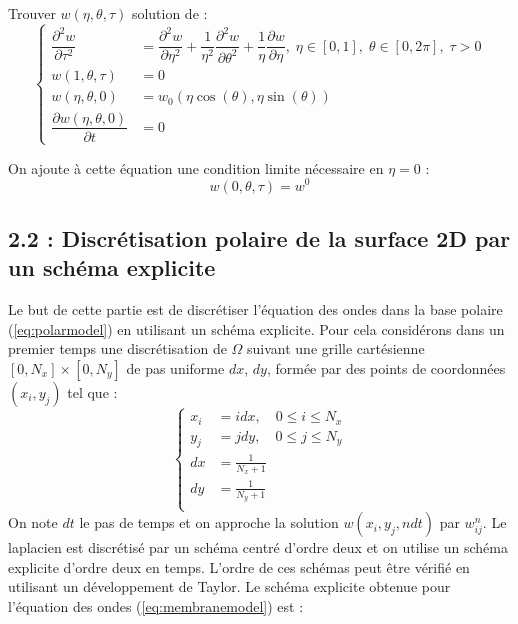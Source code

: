 \documentclass[a4,12pt]{article}
\begin{document}
	Trouver $w(\eta,\theta,\tau)$ solution de :
	\begin{equation}
	  \left\{
	    \begin{array}{rl}
	      \dfrac{\partial^2 w}{\partial \tau^2} & =   \dfrac{\partial^2 w}{\partial \eta^2}+\dfrac{1}
	      {\eta^2}\dfrac{\partial^2 w}{\partial \theta^2}+\dfrac{1}{\eta}\dfrac{\partial w}{\partial \eta},\;\eta\in[0,1],\;		\theta\in[0,2\pi],\;\tau>0\\
	      w(1,\theta,\tau)& = 0  \\
	      w(\eta,\theta,0)& = w_0(\eta \cos(\theta),\eta \sin (\theta)) \\
	      \dfrac{\partial w(\eta,\theta,0)}{\partial t} & = 0
	    \end{array}
	    \right.
	    \label{eq:polarmodel}
	  \end{equation}

	  On ajoute à cette équation une condition limite nécessaire  en $\eta=0$ :
	  \[
	    w(0,\theta,\tau)=w^0
	  \]


	  \subsection*{2.2 : Discrétisation polaire de la surface 2D par un schéma explicite }
	  Le but de cette partie est de discrétiser l'équation des ondes dans la base polaire (\ref{eq:polarmodel}) en utilisant un schéma explicite. Pour cela considérons dans un premier temps une discrétisation de $\Omega $ suivant une grille cartésienne $[0,N_x]\times [0,N_y]$ de pas uniforme $dx$, $dy$, formée par des points de coordonnées $(x_i,y_j)$ tel que :
	  \begin{equation*}{}
	    \left\{
	      \begin{array}{rl}
		x_i &=i dx,\quad 0\leq i \leq N_x \\
		y_j &=j dy,\quad  0\leq j \leq N_y \\
		dx & =\frac{1}{N_x+1}\\
		dy &=\frac{1}{N_y+1}\\
	      \end{array}
	      \right.
	    \end{equation*}
	    On note $dt$ le pas de temps et on approche la solution $w(x_i,y_j,ndt)$ par $w_{ij}^{n}$. Le laplacien est discrétisé  par un schéma centré d'ordre deux  et on utilise un schéma explicite d'ordre deux en temps. L'ordre de ces schémas peut être vérifié en utilisant un développement de Taylor. Le schéma explicite obtenue pour l'équation des ondes (\ref{eq:membranemodel}) est :
\end{document}

